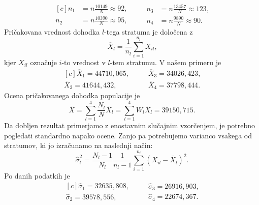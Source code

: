 \documentclass{article}
\begin{document}
\begin{equation*}
    \begin{aligned}[c]
        n_1 &= n \frac{10149}{N} \approx 92 \text{,}\\
        n_2 &= n \frac{10390}{N} \approx 95\text{,}
    \end{aligned}
    \qquad
    \begin{aligned}
        n_3 &= n \frac{13457}{N} \approx 123 \text{,}\\
        n_4 &= n \frac{9890}{N} \approx 90\text{.}
    \end{aligned}
\end{equation*}
Pričakovana vrednost dohodka $l$-tega stratuma je določena z 
$$ \overline{X}_l = \frac{1}{n_l} \sum_{i=1}^{n_l} X_{il} \text{,}$$
kjer $X_{il}$ označuje $i$-to vrednost v $l$-tem stratumu. V našem primeru je
\begin{equation*}
    \begin{aligned}[c]
        \overline{X}_1 = 44710{,}065\text{,}\\
        \overline{X}_2 = 41644{,}432\text{,}
    \end{aligned}
    \qquad
    \begin{aligned}
        \overline{X}_3 = 34026{,}423 \text{,}\\
        \overline{X}_4 = 37798{,}444\text{.}
    \end{aligned}
\end{equation*}
Ocena pričakovanega dohodka populacije je
$$ \overline{X} = \sum_{l=1}^{4} \frac{N_l}{N} \overline{X}_l = \sum_{l=1}^{4} W_l \overline{X}_l = 39150{,}715 \text{.}$$
Da dobljen rezultat primerjamo z enostavnim slučajnim vzorčenjem, je potrebno pogledati 
standardno napako ocene. Zanjo pa potrebujemo varianco vsakega od stratumov, ki jo 
izračunamo na naslednji način:
$$ \hat{\sigma}_l^2 = \frac{N_l - 1}{N_l} \frac{1}{n_l - 1} \sum_{i=1}^{n_l} \left( X_{il} - \overline{X}_l \right)^2 \text{.}$$
Po danih podatkih je
\begin{equation*}
    \begin{aligned}[c]
        \hat{\sigma}_1 = 32635{,}808\text{,}\\
        \hat{\sigma}_2 = 39578{,}556\text{,}
    \end{aligned}
    \qquad
    \begin{aligned}
        \hat{\sigma}_3 = 26916{,}903 \text{,}\\
        \hat{\sigma}_4 = 22674{,}367\text{.}
    \end{aligned}
\end{equation*}
\end{document}
